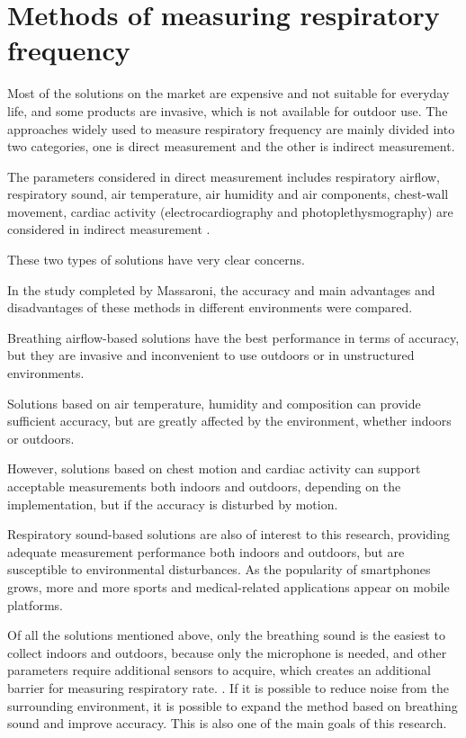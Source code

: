 \section{Methods of measuring respiratory frequency}
Most of the solutions on the market are expensive and not suitable for everyday life, and some products are invasive, which is not available for outdoor use. The approaches widely used to measure respiratory frequency are mainly divided into two categories, one is direct measurement and the other is indirect measurement.

The parameters considered in direct measurement includes respiratory airflow, respiratory sound, air temperature, air humidity and air components, chest-wall movement, cardiac activity (electrocardiography and photoplethysmography) are considered in indirect measurement \cite{Massaroni2019Contact-BasedRate}.

These two types of solutions have very clear concerns. 

In the study completed by Massaroni, the accuracy and main advantages and disadvantages of these methods in different environments were compared.

Breathing airflow-based solutions have the best performance in terms of accuracy, but they are invasive and inconvenient to use outdoors or in unstructured environments. 

Solutions based on air temperature, humidity and composition can provide sufficient accuracy, but are greatly affected by the environment, whether indoors or outdoors. 

However, solutions based on chest motion and cardiac activity can support acceptable measurements both indoors and outdoors, depending on the implementation, but if the accuracy is disturbed by motion. 

Respiratory sound-based solutions are also of interest to this research, providing adequate measurement performance both indoors and outdoors, but are susceptible to environmental disturbances. As the popularity of smartphones grows, more and more sports and medical-related applications appear on mobile platforms.

Of all the solutions mentioned above, only the breathing sound is the easiest to collect indoors and outdoors, because only the microphone is needed, and other parameters require additional sensors to acquire, which creates an additional barrier for measuring respiratory rate. . If it is possible to reduce noise from the surrounding environment, it is possible to expand the method based on breathing sound and improve accuracy. This is also one of the main goals of this research.

